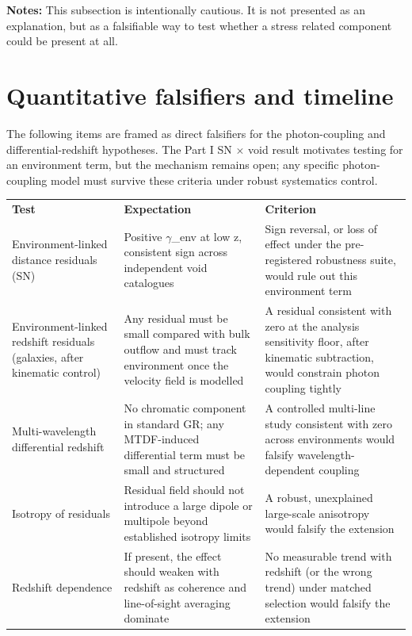 \documentclass[11pt,a4paper]{article}
\begin{document}
\begin{mdframed}[linecolor=accent,linewidth=0.5pt,backgroundcolor=callout-bg,leftline=true,rightline=true,topline=true,bottomline=true,innerleftmargin=8pt,innerrightmargin=8pt,innertopmargin=6pt,innerbottommargin=6pt]
\textbf{Notes:} This subsection is intentionally cautious. It is not presented as an explanation, but as a falsifiable way to test whether a stress related component could be present at all.
\end{mdframed}

\section{Quantitative falsifiers and timeline}
\label{sec:tests}
The following items are framed as direct falsifiers for the photon-coupling and differential-redshift hypotheses. The Part I SN $\times$ void result motivates testing for an environment term, but the mechanism remains open; any specific photon-coupling model must survive these criteria under robust systematics control.

\begin{table}[H]
\centering
\footnotesize
\begin{tabularx}{\linewidth}{l>{\RaggedRight\arraybackslash}X>{\RaggedRight\arraybackslash}X}
\toprule
\textbf{Test} & \textbf{Expectation} & \textbf{Criterion} \tabularnewline
Environment-linked distance residuals (SN) & Positive $\gamma$\_\allowbreak{}env at low z, consistent sign across independent void catalogues & Sign reversal, or loss of effect under the pre-registered robustness suite, would rule out this environment term \tabularnewline
Environment-linked redshift residuals (galaxies, after kinematic control) & Any residual must be small compared with bulk outflow and must track environment once the velocity field is modelled & A residual consistent with zero at the analysis sensitivity floor, after kinematic subtraction, would constrain photon coupling tightly \tabularnewline
Multi-wavelength differential redshift & No chromatic component in standard GR; any MTDF-induced differential term must be small and structured & A controlled multi-line study consistent with zero across environments would falsify wavelength-dependent coupling \tabularnewline
Isotropy of residuals & Residual field should not introduce a large dipole or multipole beyond established isotropy limits & A robust, unexplained large-scale anisotropy would falsify the extension \tabularnewline
Redshift dependence & If present, the effect should weaken with redshift as coherence and line-of-sight averaging dominate & No measurable trend with redshift (or the wrong trend) under matched selection would falsify the extension \tabularnewline
\bottomrule
\end{tabularx}
\end{table}
\end{document}
